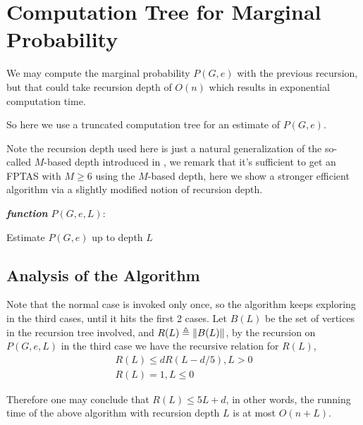 
\section{Computation Tree for Marginal Probability}

We may compute the marginal probability $P(G, e)$ with the previous recursion, but
that could take recursion depth of $O(n)$ which results in exponential computation time.

So here we use a truncated computation tree for an estimate of $P(G,e)$.

Note the recursion depth used here is just a natural generalization of the so-called $M$-based depth introduced in \cite{LLY12}, we remark that it's sufficient to get an FPTAS with $M\geq 6$ using the $M$-based depth, here we show a stronger efficient algorithm via a slightly modified notion of recursion depth.

\IncMargin{1em}
\begin{algorithm}[H]
\emph{ \textbf{function} $P(G, e, L):$}
\BlankLine
{}
 \caption{Estimate $P(G,e)$ up to depth $L$}
\end{algorithm}
\DecMargin{1em}

\subsection{Analysis of the Algorithm}
Note that the normal case is invoked only once, so the algorithm keeps exploring in the third cases, until it hits the first 2 cases. Let $B(L)$ be the set of vertices in the recursion tree involved, and $R(L) \triangleq \left\Vert B(L)\right\Vert$,
 by the recursion on $P(G,e,L)$ in the third case we have the recursive relation for $R(L)$,
 \begin{align*}
	 R(L) \leq d R(L-d/5) , L > 0\\
	 R(L) = 1, L\leq 0
 \end{align*}

 Therefore one may conclude that $R(L) \leq 5L + d$, in other words, the running time of the above algorithm with recursion depth $L$ is at most $O(n + L)$.
